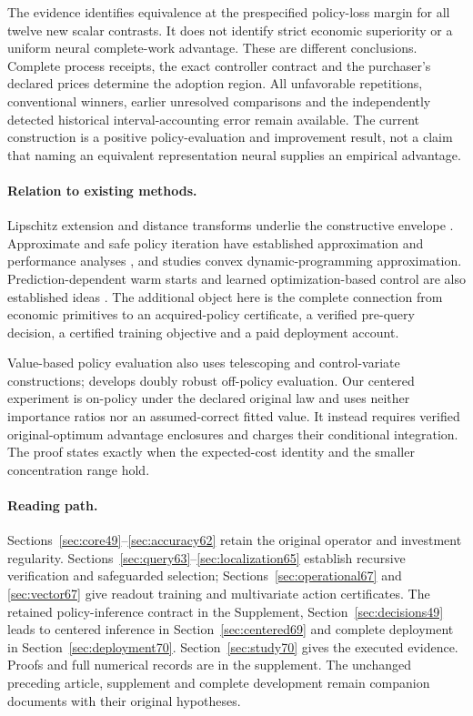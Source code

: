 \documentclass[ecta,nameyear,draft]{econsocart}
\begin{document}
The evidence identifies equivalence at the prespecified policy-loss margin for all twelve new scalar contrasts. It does not identify strict economic superiority or a uniform neural complete-work advantage. These are different conclusions. Complete process receipts, the exact controller contract and the purchaser's declared prices determine the adoption region. All unfavorable repetitions, conventional winners, earlier unresolved comparisons and the independently detected historical interval-accounting error remain available. The current construction is a positive policy-evaluation and improvement result, not a claim that naming an equivalent representation neural supplies an empirical advantage.

\paragraph{Relation to existing methods.}
Lipschitz extension and distance transforms underlie the constructive envelope \citep{mcshane1934,felzenszwalb2012}. Approximate and safe policy iteration have established approximation and performance analyses \citep{munos2003,pirotta2013,scherrer2015}, and \citet{yang2020convex} studies convex dynamic-programming approximation. Prediction-dependent warm starts and learned optimization-based control are also established ideas \citep{sakaue2023warm,sambharya2023,agrawal2020control}. The additional object here is the complete connection from economic primitives to an acquired-policy certificate, a verified pre-query decision, a certified training objective and a paid deployment account.

Value-based policy evaluation also uses telescoping and control-variate constructions; \citet{jiang2016} develops doubly robust off-policy evaluation. Our centered experiment is on-policy under the declared original law and uses neither importance ratios nor an assumed-correct fitted value. It instead requires verified original-optimum advantage enclosures and charges their conditional integration. The proof states exactly when the expected-cost identity and the smaller concentration range hold.

\paragraph{Reading path.}
Sections~\ref{sec:core49}--\ref{sec:accuracy62} retain the original operator and investment regularity. Sections~\ref{sec:query63}--\ref{sec:localization65} establish recursive verification and safeguarded selection; Sections~\ref{sec:operational67} and \ref{sec:vector67} give readout training and multivariate action certificates. The retained policy-inference contract in the Supplement, Section~\ref{sec:decisions49} leads to centered inference in Section~\ref{sec:centered69} and complete deployment in Section~\ref{sec:deployment70}. Section~\ref{sec:study70} gives the executed evidence. Proofs and full numerical records are in the supplement. The unchanged preceding article, supplement and complete development remain companion documents with their original hypotheses.
\end{document}
